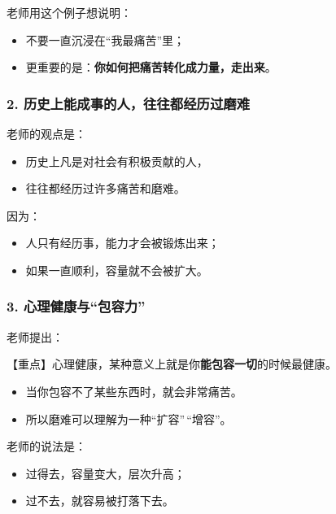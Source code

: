 \documentclass[
  chinese,
  9pt,
  a4paper,
]{ctexart}
\providecommand{\tightlist}{%
  \setlength{\itemsep}{0pt}\setlength{\parskip}{0pt}}
\begin{document}
老师用这个例子想说明：

\begin{itemize}
\tightlist
\item
  不要一直沉浸在``我最痛苦''里；
\item
  更重要的是：\textbf{你如何把痛苦转化成力量，走出来}。
\end{itemize}

\subsubsection{2.
历史上能成事的人，往往都经历过磨难}\label{ux5386ux53f2ux4e0aux80fdux6210ux4e8bux7684ux4ebaux5f80ux5f80ux90fdux7ecfux5386ux8fc7ux78e8ux96be}

老师的观点是：

\begin{itemize}
\tightlist
\item
  历史上凡是对社会有积极贡献的人，
\item
  往往都经历过许多痛苦和磨难。
\end{itemize}

因为：

\begin{itemize}
\tightlist
\item
  人只有经历事，能力才会被锻炼出来；
\item
  如果一直顺利，容量就不会被扩大。
\end{itemize}

\subsubsection{3.
心理健康与``包容力''}\label{ux5fc3ux7406ux5065ux5eb7ux4e0eux5305ux5bb9ux529b}

老师提出：

【重点】心理健康，某种意义上就是你\textbf{能包容一切}的时候最健康。

\begin{itemize}
\tightlist
\item
  当你包容不了某些东西时，就会非常痛苦。
\item
  所以磨难可以理解为一种``扩容''\,``增容''。
\end{itemize}

老师的说法是：

\begin{itemize}
\tightlist
\item
  过得去，容量变大，层次升高；
\item
  过不去，就容易被打落下去。
\end{itemize}
\end{document}
